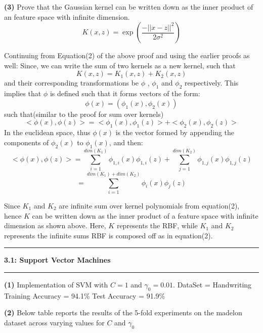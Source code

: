 \documentclass{article}
\newcommand\question[2]{\vspace{.25in}\hrule\textbf{#1: #2}\hrule\vspace{.10in}}
\renewcommand\part[1]{\vspace{.10in}\textbf{(#1)}}
\begin{document}
    \part{3} Prove that the Gaussian kernel can be written down as the inner product of an feature space with infinite dimension. 
    \[K(x,z) = \exp(\dfrac{-||x-z||^2}{2{\sigma}^2})\]

    Continuing from Equation(2) of the above proof and using the earlier proofs as well: \newline
    Since, we can write the sum of two kernels as a new kernel, such that
    \[K(x,z) = K_1(x,z) + K_2(x,z)\]
    and their corresponding transformations be $\phi$ , $\phi_1$ and $\phi_2$ respectively. This implies that $\phi$ is defined such that it forms vectors of the form:
    \[ \phi(x) = (\phi_1(x), \phi_2(x))\]
    such that(similar to the proof for sum over kernels)
   \[ <\phi(x),\phi(z)> = <\phi_1(x), \phi_1(z)> + <\phi_2(x), \phi_2(z)>\]
   In the euclidean space, thus $\phi(x)$ is the vector formed by appending the components of $\phi_2(x)$ to $\phi_1(x)$, and then:
   \[<\phi(x), \phi(z)> = \sum_{i=1}^{dim(K_1)} \phi_{1,i}(x)\phi_{1,i}(z) + \sum_{j=1}^{dim(K_2)} \phi_{1,j}(x)\phi_{1,j}(z)\]
   \[ = \sum_{i=1}^{dim(K_1)+dim(K_2)} \phi_{i}(x)\phi_{j}(z)\]

   Since $K_1$ and $K_2$ are infinite sum over kernel polynomials from equation(2), hence $K$ can be written down as the inner product of a feature space with infinite dimension as shown above. Here, $K$ represents the RBF, while $K_1$ and $K_2$ represents the infinite sums RBF is composed off as in equation(2). \newline

   \question{3.1}{Support Vector Machines}
   \part{1} Implementation of SVM with $C=1$ and $\gamma_0 = 0.01$. \newline
   DataSet = Handwriting \newline
   Training Accuracy = 94.1\% \newline
   Test Accuracy = 91.9\% \newline

   \part{2} Below table reports the results of the 5-fold experiments on the madelon dataset across varying values for $C$ and $\gamma_0$
  
\end{document}
